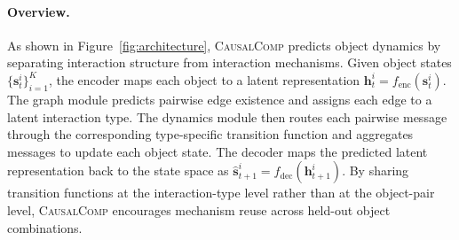 \documentclass{article}
\newcommand{\ours}{\textsc{CausalComp}}
\begin{document}
% 
\paragraph{Overview.}

As shown in Figure~\ref{fig:architecture}, \ours{} predicts object dynamics by separating interaction structure from interaction mechanisms. Given object states $\{\mathbf{s}_t^i\}_{i=1}^K$, the encoder maps each object to a latent representation $\mathbf{h}_t^i = f_\text{enc}(\mathbf{s}_t^i)$. The graph module predicts pairwise edge existence and assigns each edge to a latent interaction type. The dynamics module then routes each pairwise message through the corresponding type-specific transition function and aggregates messages to update each object state. The decoder maps the predicted latent representation back to the state space as $\hat{\mathbf{s}}_{t+1}^i = f_\text{dec}(\mathbf{h}_{t+1}^i)$. By sharing transition functions at the interaction-type level rather than at the object-pair level, \ours{} encourages mechanism reuse across held-out object combinations.

\end{document}

